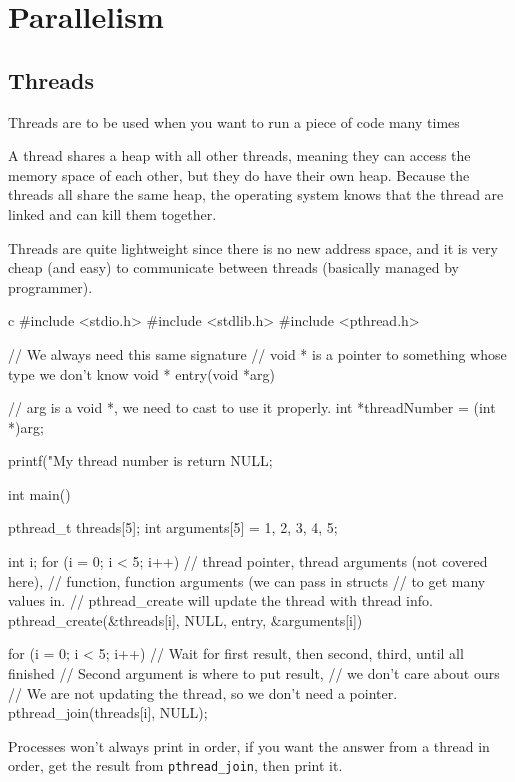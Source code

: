 \section{Parallelism}\label{sec:parallelism}

\subsection{Threads}\label{sub:threads_parallelism}

Threads are to be used when you want to run a piece of code many times

A thread shares a heap with all other threads, meaning they can access the memory space of each other, but they do have their own heap.
Because the threads all share the same heap, the operating system knows that the thread are linked and can kill them together.

Threads are quite lightweight since there is no new address space, and it is very cheap (and easy) to communicate between threads (basically managed by programmer).

\begin{code}{c}
#include <stdio.h>
#include <stdlib.h>
#include <pthread.h>

// We always need this same signature
// void * is a pointer to something whose type we don't know
void * entry(void *arg) {
    // arg is a void *, we need to cast to use it properly.
    int *threadNumber = (int *)arg;

    printf("My thread number is %
    return NULL;
}

int main() {
    pthread_t threads[5];
    int arguments[5] = {1, 2, 3, 4, 5};

    int i;
    for (i = 0; i < 5; i++) {
        // thread pointer, thread arguments (not covered here),
        // function, function arguments (we can pass in structs
        // to get many values in.
        // pthread_create will update the thread with thread info.
        pthread_create(&threads[i], NULL, entry, &arguments[i])
    }

    for (i = 0; i < 5; i++) {
        // Wait for first result, then second, third, until all finished
        // Second argument is where to put result, 
        // we don't care about ours
        // We are not updating the thread, so we don't need a pointer.
        pthread_join(threads[i], NULL);
    }
}
\end{code}
\begin{note}
    Processes won't always print in order, if you want the answer from a thread in order, get the result from \texttt{pthread_join}, then print it.
\end{note}

